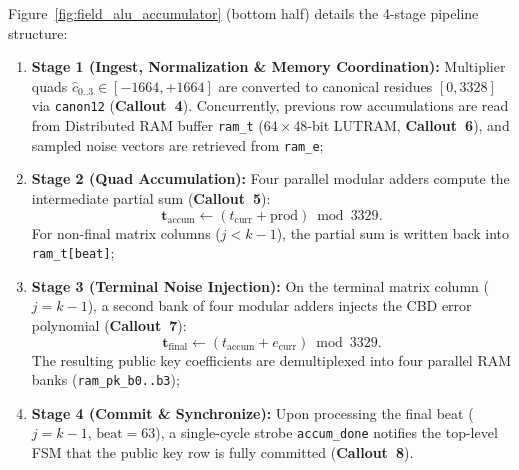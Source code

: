 Figure~\ref{fig:field_alu_accumulator} (bottom half) details the 4-stage pipeline structure:
\begin{enumerate}
    \item \textbf{Stage 1 (Ingest, Normalization \& Memory Coordination):} Multiplier quads $\hat{c}_{0..3} \in [-1664, +1664]$ are converted to canonical residues $[0, 3328]$ via \texttt{canon12} (\textbf{Callout~4}). Concurrently, previous row accumulations are read from Distributed RAM buffer \texttt{ram\_t} ($64 \times 48$-bit LUTRAM, \textbf{Callout~6}), and sampled noise vectors are retrieved from \texttt{ram\_e};
    \item \textbf{Stage 2 (Quad Accumulation):} Four parallel modular adders compute the intermediate partial sum (\textbf{Callout~5}):
    \begin{equation}
    \mathbf{t}_{\text{accum}} \leftarrow (t_{\text{curr}} + \text{prod}) \bmod 3329.
    \end{equation}
    For non-final matrix columns ($j < k-1$), the partial sum is written back into \texttt{ram\_t[beat]};
    \item \textbf{Stage 3 (Terminal Noise Injection):} On the terminal matrix column ($j = k-1$), a second bank of four modular adders injects the CBD error polynomial (\textbf{Callout~7}):
    \begin{equation}
    \mathbf{t}_{\text{final}} \leftarrow (t_{\text{accum}} + e_{\text{curr}}) \bmod 3329.
    \end{equation}
    The resulting public key coefficients are demultiplexed into four parallel RAM banks (\texttt{ram\_pk\_b0..b3});
    \item \textbf{Stage 4 (Commit \& Synchronize):} Upon processing the final beat ($j = k-1$, $\text{beat} = 63$), a single-cycle strobe \texttt{accum\_done} notifies the top-level FSM that the public key row is fully committed (\textbf{Callout~8}).
\end{enumerate}

